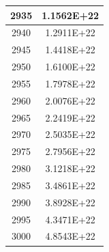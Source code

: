 \documentclass[a4paper]{article}
\begin{document}
\begin{tabular}{|c|c|}
		\hline
		2935 & 1.1562E+22 \\
		\hline
		2940 & 1.2911E+22 \\
		\hline
		2945 & 1.4418E+22 \\
		\hline
		2950 & 1.6100E+22 \\
		\hline
		2955 & 1.7978E+22 \\
		\hline
		2960 & 2.0076E+22 \\
		\hline
		2965 & 2.2419E+22 \\
		\hline
		2970 & 2.5035E+22 \\
		\hline
		2975 & 2.7956E+22 \\
		\hline
		2980 & 3.1218E+22 \\
		\hline
		2985 & 3.4861E+22 \\
		\hline
		2990 & 3.8928E+22 \\
		\hline
		2995 & 4.3471E+22 \\
		\hline
		3000 & 4.8543E+22 \\
		\hline
	\end{tabular}
	
	\normalsize
	
	\pagebreak
	
	\small
	
\end{document}
